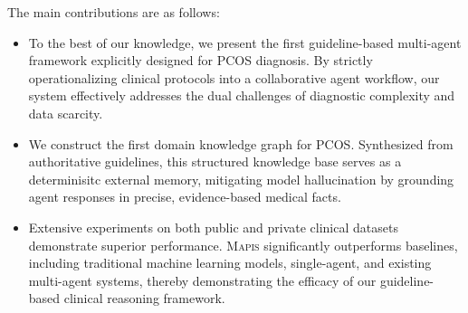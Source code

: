 \documentclass[a4paper,fleqn]{cas-dc}
\begin{document}

The main contributions are as follows:
\begin{itemize}
    \item [\textbullet] To the best of our knowledge, we present the first guideline-based multi-agent framework explicitly designed for PCOS diagnosis. By strictly operationalizing clinical protocols into a collaborative agent workflow, our system effectively addresses the dual challenges of diagnostic complexity and data scarcity.
    \item [\textbullet] We construct the first domain knowledge graph for PCOS. Synthesized from authoritative guidelines, this structured knowledge base serves as a determinisitc external memory, mitigating model hallucination by grounding agent responses in precise, evidence-based medical facts.
    \item [\textbullet] Extensive experiments on both public and private clinical datasets demonstrate superior performance. \textsc{Mapis} significantly outperforms baselines, including traditional machine learning models, single-agent, and existing multi-agent systems, thereby demonstrating the efficacy of our guideline-based clinical reasoning framework.

\end{itemize}
\end{document}
